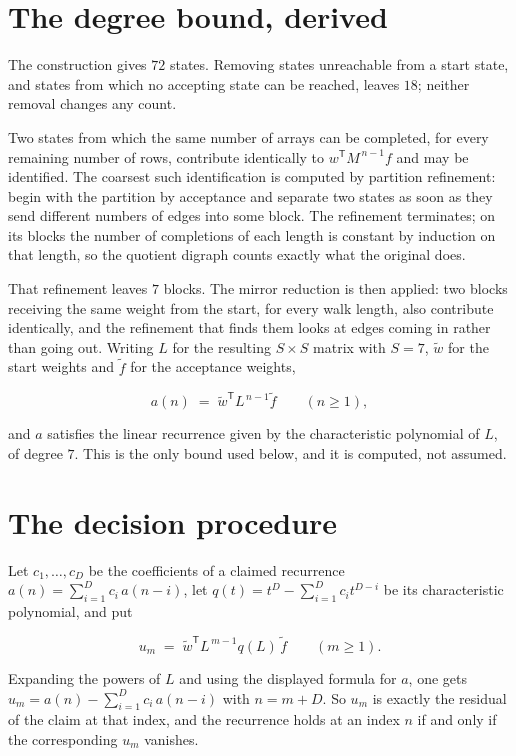 \documentclass[11pt]{article}
\theoremstyle{definition}
\begin{document}
\section{The degree bound, derived}

The construction gives $72$ states. Removing states unreachable from a start state, and states from which no accepting state can be reached, leaves $18$; neither removal changes any count.

Two states from which the same number of arrays can be completed, for every remaining number of rows, contribute identically to $w^{\mathsf T}M^{\,n-1}f$ and may be identified. The coarsest such identification is computed by partition refinement: begin with the partition by acceptance and separate two states as soon as they send different numbers of edges into some block. The refinement terminates; on its blocks the number of completions of each length is constant by induction on that length, so the quotient digraph counts exactly what the original does.

That refinement leaves $7$ blocks. The mirror reduction is then applied: two blocks receiving the same weight from the start, for every walk length, also contribute identically, and the refinement that finds them looks at edges coming in rather than going out. Writing $L$ for the resulting $S \times S$ matrix with $S = 7$, $\tilde w$ for the start weights and $\tilde f$ for the acceptance weights,

\[a(n) \;=\; \tilde w^{\mathsf T} L^{\,n-1} \tilde f \qquad (n \ge 1),\]

and $a$ satisfies the linear recurrence given by the characteristic polynomial of $L$, of degree $7$. This is the only bound used below, and it is computed, not assumed.

\section{The decision procedure}

Let $c_1,\dots,c_D$ be the coefficients of a claimed recurrence $a(n) = \sum_{i=1}^{D} c_i\,a(n-i)$, let $q(t) = t^{D} - \sum_{i=1}^{D} c_i t^{D-i}$ be its characteristic polynomial, and put

\[u_m \;=\; \tilde w^{\mathsf T} L^{\,m-1} q(L)\,\tilde f \qquad (m \ge 1).\]

Expanding the powers of $L$ and using the displayed formula for $a$, one gets $u_m = a(n) - \sum_{i=1}^{D} c_i\,a(n-i)$ with $n = m + D$. So $u_m$ is exactly the residual of the claim at that index, and the recurrence holds at an index $n$ if and only if the corresponding $u_m$ vanishes.
\end{document}
